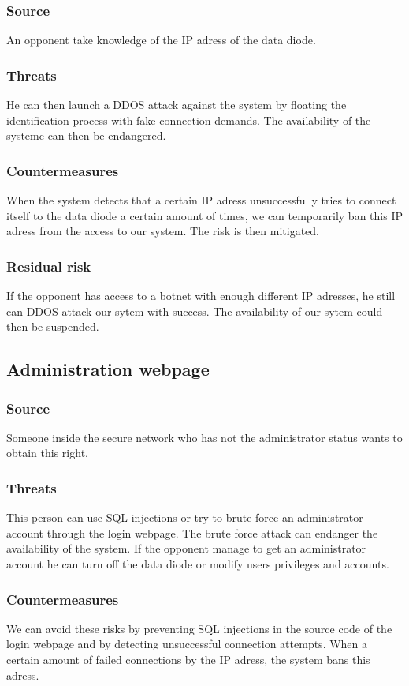 \documentclass[a4paper,11pt]{article}
\begin{document}
\subsubsection{Source}
An opponent take knowledge of the IP adress of the data diode.
\subsubsection{Threats}
He can then launch a DDOS attack against the system by floating the identification process with fake connection demands. The availability of the systemc can then be endangered.
\subsubsection{Countermeasures}
When the system detects that a certain IP adress unsuccessfully tries to connect itself to the data diode a certain amount of times, we can temporarily ban this IP adress from the access to our system.  The risk is then mitigated.
\subsubsection{Residual risk}
If the opponent has access to a botnet with enough different IP adresses, he still can DDOS attack our sytem with success. The availability of our sytem could then be suspended.
\subsection{Administration webpage}
\subsubsection{Source}
Someone inside the secure network who has not the administrator status wants to obtain this right.
\subsubsection{Threats}
This person can use SQL injections or try to brute force an administrator account through the login webpage. The brute force attack can endanger the availability of the system. If the opponent manage to get an administrator account he can turn off the data diode or modify users privileges and accounts.
\subsubsection{Countermeasures}
We can avoid these risks by preventing SQL injections in the source code of the login webpage and by detecting unsuccessful connection attempts. When a certain amount of failed connections by the IP adress, the system bans this adress.
\end{document}
